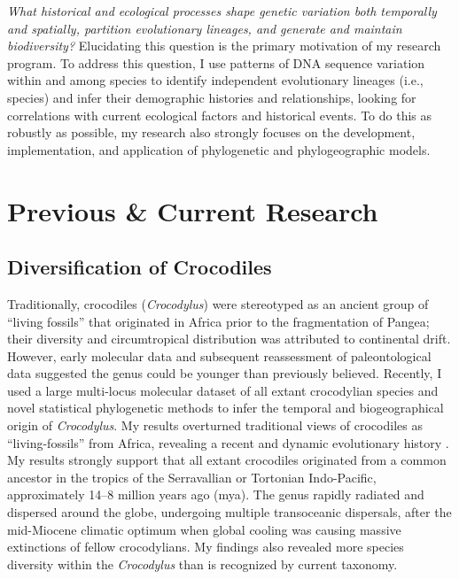 \documentclass[10pt]{article}
\begin{document}
\raggedright
\singlespacing

\emph{What historical and ecological processes shape genetic variation both temporally and spatially, partition evolutionary lineages, and generate and maintain biodiversity?}
Elucidating this question is the primary motivation of my research program.
To address this question, I use patterns of DNA sequence variation within and among species to identify independent evolutionary lineages (i.e., species) and infer their demographic histories and relationships, looking for correlations with current ecological factors and historical events.
To do this as robustly as possible, my research also strongly focuses on the development, implementation, and application of phylogenetic and phylogeographic models.

\section*{Previous \& Current Research}
\subsection*{Diversification of Crocodiles}
Traditionally, crocodiles (\emph{Crocodylus}) were stereotyped as an ancient group of ``living fossils'' that originated in Africa prior to the fragmentation of Pangea; their diversity and circumtropical distribution was attributed to continental drift.
However, early molecular data and subsequent reassessment of paleontological data suggested the genus could be younger than previously believed.
Recently, I used a large multi-locus molecular dataset of all extant crocodylian species and novel statistical phylogenetic methods to infer the temporal and biogeographical origin of \emph{Crocodylus}.
My results overturned traditional views of crocodiles as ``living-fossils'' from Africa, revealing a recent and dynamic evolutionary history \cite{Oaks2011}.
My results strongly support that all extant crocodiles originated from a common ancestor in the tropics of the Serravallian or Tortonian Indo-Pacific, approximately 14--8 million years ago (mya).
The genus rapidly radiated and dispersed around the globe, undergoing multiple transoceanic dispersals, after the mid-Miocene climatic optimum when global cooling was causing massive extinctions of fellow crocodylians.
My findings also revealed more species diversity within the \emph{Crocodylus} than is recognized by current taxonomy.
\end{document}
